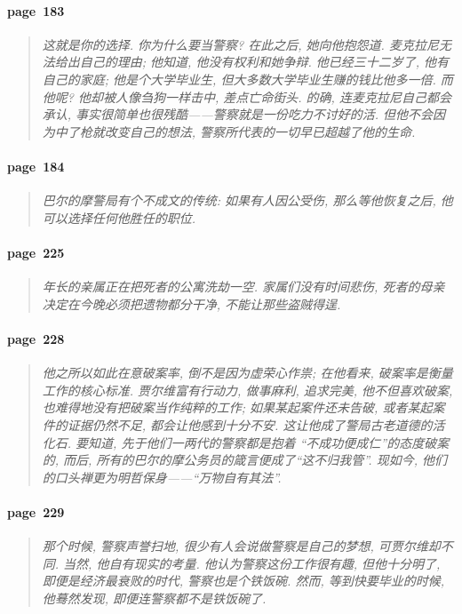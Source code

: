 \paragraph*{page~183}
\begin{quotation}
    \itshape
    这就是你的选择. 你为什么要当警察? 在此之后, 她向他抱怨道. 麦克拉尼无法给出自己的理由; 他知道, 他没有权利和她争辩. 他已经三十二岁了, 他有自己的家庭; 他是个大学毕业生, 但大多数大学毕业生赚的钱比他多一倍. 而他呢? 他却被人像刍狗一样击中, 差点亡命街头. 的确, 连麦克拉尼自己都会承认, 事实很简单也很残酷------警察就是一份吃力不讨好的活. 但他不会因为中了枪就改变自己的想法, 警察所代表的一切早已超越了他的生命.  
\end{quotation}

\paragraph*{page~184}
\begin{quotation}
    \itshape
    巴尔的摩警局有个不成文的传统: 如果有人因公受伤, 那么等他恢复之后, 他可以选择任何他胜任的职位. 
\end{quotation}

\paragraph*{page~225}
\begin{quotation}
    \itshape
    年长的亲属正在把死者的公寓洗劫一空. 家属们没有时间悲伤, 死者的母亲决定在今晚必须把遗物都分干净, 不能让那些盗贼得逞. 
\end{quotation}

\paragraph*{page~228}
\begin{quotation}
    \itshape
    他之所以如此在意破案率, 倒不是因为虚荣心作祟; 在他看来, 破案率是衡量工作的核心标准. 贾尔维富有行动力, 做事麻利, 追求完美, 他不但喜欢破案, 也难得地没有把破案当作纯粹的工作; 如果某起案件还未告破, 或者某起案件的证据仍然不足, 都会让他感到十分不安. 这让他成了警局古老道德的活化石. 要知道, 先于他们一两代的警察都是抱着 ``不成功便成仁''的态度破案的, 而后, 所有的巴尔的摩公务员的箴言便成了``这不归我管''. 现如今, 他们的口头禅更为明哲保身------``万物自有其法''.
\end{quotation}

\paragraph*{page~229}
\begin{quotation}
    \itshape
    那个时候, 警察声誉扫地, 很少有人会说做警察是自己的梦想, 可贾尔维却不同. 当然, 他自有现实的考量. 他认为警察这份工作很有趣, 但他十分明了, 即便是经济最衰败的时代, 警察也是个铁饭碗. 然而, 等到快要毕业的时候, 他蓦然发现, 即便连警察都不是铁饭碗了. 
\end{quotation}

